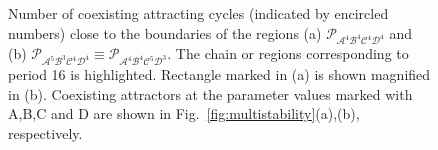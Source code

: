 \documentclass[10pt]{article}
\newif\ifFigs       \Figsfalse
\renewcommand{\P}{{\mathcal P}}
\newcommand{\A}{{\mathcal A}}
\newcommand{\B}{{\mathcal B}}
\newcommand{\C}{{\mathcal C}}
\newcommand{\D}{{\mathcal D}}
\newcommand{\Includegraphics}[2]%
           {\centering
             \ifFigs\texttt{[image: \#2]}%
             \else  \texttt{[image: \#2]}\fi}
\newcommand{\Includesubgraphics}[3]%
{\begin{minipage}[b]{#1}
    \Includegraphics{\textwidth}{#2}\\
    \centerline{{\footnotesize (#3)}}
  \end{minipage}
}
\begin{document}
\medskip

\begin{figure}[t]
	\caption{\label{fig:2D:blowup:numbers}Number of coexisting
		attracting cycles (indicated by encircled numbers) close to the
		boundaries of the regions (a) $\P_{\A^4\B^4\C^4\D^4}$ and (b)
		$\P_{\A^5\B^3\C^4\D^4}\equiv\P_{\A^4\B^4\C^5\D^3}$. The chain or
		regions corresponding to period 16 is highlighted. Rectangle
		marked in (a) is shown magnified in (b).  Coexisting attractors at
		the parameter values marked with A,B,C and D are shown in
		Fig.~\ref{fig:multistability}(a),(b), respectively.
	}
\end{figure}
\end{document}
